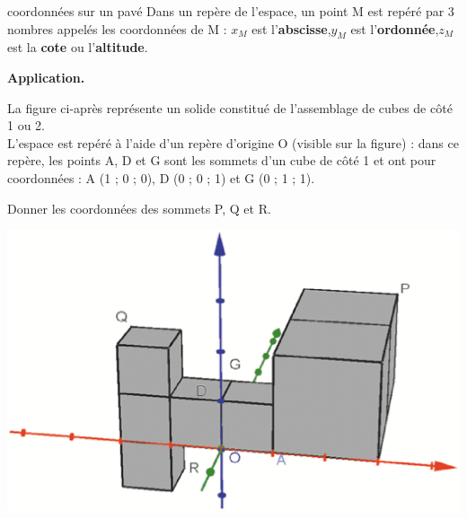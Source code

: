 \documentclass[openany]{book}
\begin{document}

\begin{DefT}{coordonnées sur un pavé}
Dans un repère de l'espace, un point M est repéré par 3 nombres appelés les coordonnées de M :
$x_M$ est l'\textbf{abscisse},$y_M$ est l'\textbf{ordonnée},$z_M$ est la \textbf{cote} ou l'\textbf{altitude}.

\end{DefT}
 
 \vspace{1cm}
 
\textbf{Application.}

\begin{minipage}{0.7\linewidth}
La figure ci-après représente un solide constitué de l’assemblage de cubes de côté 1 ou 2.\\
L’espace est repéré à l’aide d’un repère d’origine O (visible sur la figure) : dans ce repère, les
points A, D et G sont les sommets d’un cube de côté 1 et ont pour coordonnées : A (1 ; 0 ; 0),
D (0 ; 0 ; 1) et G (0 ; 1 ; 1).

Donner les coordonnées des sommets P, Q et R.
\end{minipage}
\begin{minipage}{0.3\linewidth}
\includegraphics[scale=0.3]{RepE-flash4.eps}
\end{minipage}
\end{document}
